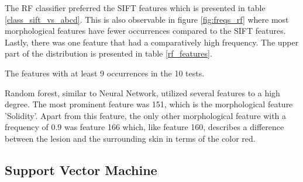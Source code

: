 \documentclass{kththesis}
\begin{document}
The RF classifier preferred the SIFT features which is presented in table \ref{class_sift_vs_abcd}. This is also observable in figure \ref{fig:freqs_rf} where most morphological features have fewer occurrences compared to the SIFT features. Lastly, there was one feature that had a comparatively high frequency. The upper part of the distribution is presented in table \ref{rf_features}.

\newpage

\begin{table}[h!]
  \caption{The features with at least 9 occurrences in the 10 tests.}
  \begin{center}
  \end{center}
  \label{rf_features}
\end{table}

Random forest, similar to Neural Network, utilized several features to a high degree. The most prominent feature was 151, which is the morphological feature 'Solidity'. Apart from this feature, the only other morphological feature with a frequency of $0.9$ was feature 166 which, like feature 160, describes a difference between the lesion and the surrounding skin in terms of the color red.


\newpage

\subsection{Support Vector Machine}
\end{document}
